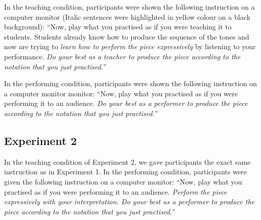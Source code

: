 \documentclass[
  english,
  man,floatsintext]{apa6}
\begin{document}
In the teaching condition, participants were shown the following instruction on a computer monitor (Italic sentences were highlighted in yellow colour on a black background): ``Now, play what you practised as if you were teaching it to students. Students already know how to produce the sequence of the tones and now are trying to \emph{learn how to perform the piece expressively} by listening to your performance. \emph{Do your best as a teacher to produce the piece according to the notation that you just practised.}''

In the performing condition, participants were shown the following instruction on a computer monitor monitor: ``Now, play what you practised as if you were performing it to an audience. \emph{Do your best as a performer to produce the piece according to the notation that you just practised.}''

\hypertarget{experiment-2-1}{%
\subsection{Experiment 2}\label{experiment-2-1}}

In the teaching condition of Experiment 2, we gave participants the exact same instruction as in Experiment 1. In the performing condition, participants were given the following instruction on a computer monitor: ``Now, play what you practised as if you were performing it to an audience. \emph{Perform the piece expressively with your interpretation. Do your best as a performer to produce the piece according to the notation that you just practised.}''
\end{document}
